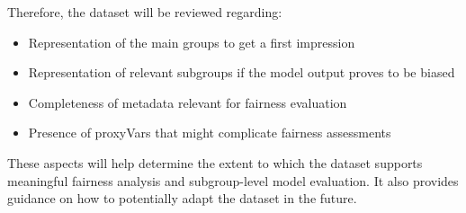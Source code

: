 \documentclass[12pt, a4paper, oneside]{book}   	%
\begin{document}
			Therefore, the dataset will be reviewed regarding:
			\begin{itemize}
				\item Representation of the main groups to get a first impression
				\item Representation of relevant subgroups if the model output proves to be biased
				\item Completeness of metadata relevant for fairness evaluation
				\item Presence of \glspl{proxyVar} that might complicate fairness assessments
			\end{itemize}
			
			These aspects will help determine the extent to which the dataset supports meaningful fairness analysis and subgroup-level model evaluation. It also provides guidance on how to potentially adapt the dataset in the future.
		
\end{document}

